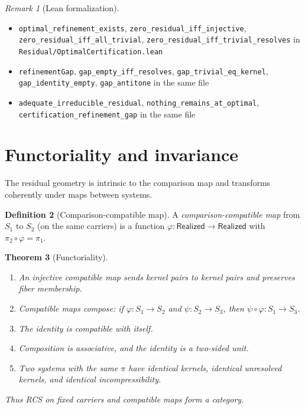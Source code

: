 \documentclass[11pt,a4paper]{article}
\theoremstyle{plain}
\newtheorem{theorem}{Theorem}[section]
\theoremstyle{definition}
\newtheorem{definition}[theorem]{Definition}
\theoremstyle{remark}
\newtheorem{remark}[theorem]{Remark}
\newcommand{\Real}{\mathsf{Realized}}
\newcommand{\compare}{\pi}
\begin{document}
\begin{remark}[Lean formalization]
\leavevmode\par\begin{itemize}[nosep,leftmargin=*,before=\raggedright]
\item \texttt{optimal\_refinement\_exists}, \texttt{zero\_residual\_iff\_injective}, \texttt{zero\_residual\_iff\_all\_trivial}, \texttt{zero\_residual\_iff\_trivial\_resolves} in \texttt{Residual/OptimalCertification.lean}
\item \texttt{refinementGap}, \texttt{gap\_empty\_iff\_resolves}, \texttt{gap\_trivial\_eq\_kernel}, \texttt{gap\_identity\_empty}, \texttt{gap\_antitone} in the same file
\item \texttt{adequate\_irreducible\_residual}, \texttt{nothing\_remains\_at\_\allowbreak{}optimal}, \texttt{certification\_refinement\_gap} in the same file
\end{itemize}
\end{remark}

\section{Functoriality and invariance}\label{sec:functorial}

The residual geometry is intrinsic to the comparison map and transforms
coherently under maps between systems.

\begin{definition}[Comparison-compatible map]\label{def:compat}
A \emph{comparison-compatible map} from $S_1$ to $S_2$ (on the same carriers)
is a function $\varphi : \Real \to \Real$ with
$\compare_2 \circ \varphi = \compare_1$.
\end{definition}

\begin{theorem}[Functoriality]\label{thm:functorial}
\leavevmode
\begin{enumerate}[label=(\roman*),nosep]
\item An injective compatible map sends kernel pairs to kernel pairs and
      preserves fiber membership.
\item Compatible maps compose: if $\varphi : S_1 \to S_2$ and
      $\psi : S_2 \to S_3$, then $\psi \circ \varphi : S_1 \to S_3$.
\item The identity is compatible with itself.
\item Composition is associative, and the identity is a two-sided unit.
\item Two systems with the same $\compare$ have identical kernels,
      identical unresolved kernels, and identical incompressibility.
\end{enumerate}
Thus RCS on fixed carriers and compatible maps form a category.
\end{theorem}
\end{document}
